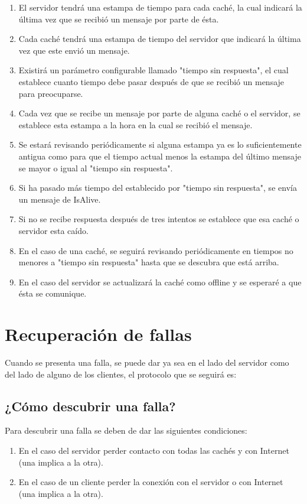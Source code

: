 \begin{enumerate}
\item El servidor tendrá una estampa de tiempo para cada caché, la cual indicará la última vez que se recibió un mensaje por parte de ésta.
\item Cada caché tendrá una estampa de tiempo del servidor que indicará la última vez que este envió un mensaje.
\item Existirá un parámetro configurable llamado "tiempo sin respuesta", el cual establece cuanto tiempo debe pasar después de que se recibió un mensaje para preocuparse.
\item Cada vez que se recibe un mensaje por parte de alguna caché o el servidor, se establece esta estampa a la hora en la cual se recibió el mensaje.
\item Se estará revisando periódicamente si alguna estampa ya es lo suficientemente antigua como para que el tiempo actual menos la estampa del último mensaje se mayor o igual al "tiempo sin respuesta".
\item Si ha pasado más tiempo del establecido por "tiempo sin respuesta", se envía un mensaje de IsAlive.
\item Si no se recibe respuesta después de tres intentos se establece que esa caché o servidor esta caído.
\item En el caso de una caché, se seguirá revisando periódicamente en tiempos no menores a "tiempo sin respuesta" hasta que se descubra que está arriba.
\item En el caso del servidor se actualizará la caché como offline y se esperaré a que ésta se comunique.
\end{enumerate}

\section{Recuperación de fallas}
Cuando se presenta una falla, se puede dar ya sea en el lado del servidor como del lado de alguno de los clientes, el protocolo que se seguirá es:

\subsection{¿Cómo descubrir una falla?}
Para descubrir una falla se deben de dar las siguientes condiciones:
\begin{enumerate}
\item En el caso del servidor perder contacto con todas las cachés y con Internet (una implica a la otra).
\item En el caso de un cliente perder la conexión con el servidor o con Internet (una implica a la otra). 
\end{enumerate}

